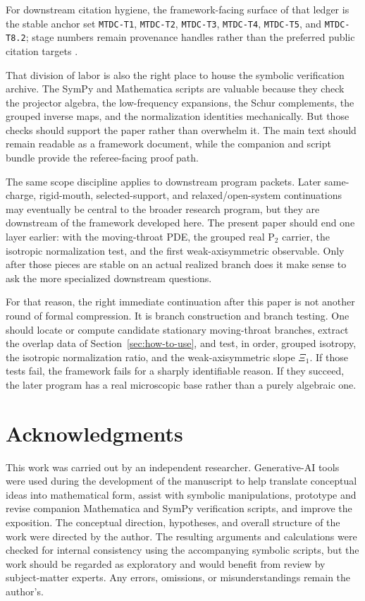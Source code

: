 \documentclass[11pt]{article}
\theoremstyle{definition}
\newcommand{\Ptwo}{\ensuremath{\mathrm{P}_2}}
\newcommand{\XiOne}{\ensuremath{\Xi_1}}
\begin{document}
For downstream citation hygiene, the framework-facing surface of that ledger is the stable anchor set \texttt{MTDC-T1}, \texttt{MTDC-T2}, \texttt{MTDC-T3}, \texttt{MTDC-T4}, \texttt{MTDC-T5}, and \texttt{MTDC-T8.2}; stage numbers remain provenance handles rather than the preferred public citation targets \cite{Norris2026PDELedger}.

That division of labor is also the right place to house the symbolic verification archive. The SymPy and Mathematica scripts are valuable because they check the projector algebra, the low-frequency expansions, the Schur complements, the grouped inverse maps, and the normalization identities mechanically. But those checks should support the paper rather than overwhelm it. The main text should remain readable as a framework document, while the companion and script bundle provide the referee-facing proof path.

The same scope discipline applies to downstream program packets. Later same-charge, rigid-mouth, selected-support, and relaxed/open-system continuations may eventually be central to the broader research program, but they are downstream of the framework developed here. The present paper should end one layer earlier: with the moving-throat PDE, the grouped real \(\Ptwo\) carrier, the isotropic normalization test, and the first weak-axisymmetric observable. Only after those pieces are stable on an actual realized branch does it make sense to ask the more specialized downstream questions.

For that reason, the right immediate continuation after this paper is not another round of formal compression. It is branch construction and branch testing. One should locate or compute candidate stationary moving-throat branches, extract the overlap data of Section~\ref{sec:how-to-use}, and test, in order, grouped isotropy, the isotropic normalization ratio, and the weak-axisymmetric slope \(\XiOne\). If those tests fail, the framework fails for a sharply identifiable reason. If they succeed, the later program has a real microscopic base rather than a purely algebraic one.

\section*{Acknowledgments}
This work was carried out by an independent researcher.
Generative-AI tools were used during the development of the manuscript to help
translate conceptual ideas into mathematical form, assist with symbolic
manipulations, prototype and revise companion Mathematica and SymPy
verification scripts, and improve the exposition.
The conceptual direction, hypotheses, and overall structure of the work were
directed by the author.
The resulting arguments and calculations were checked for internal consistency
using the accompanying symbolic scripts, but the work should be regarded as
exploratory and would benefit from review by subject-matter experts.
Any errors, omissions, or misunderstandings remain the author's.
\end{document}
